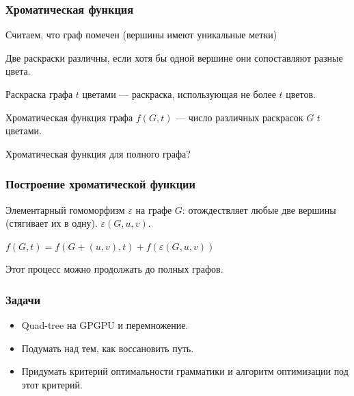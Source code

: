 \documentclass[xcolor=table]{beamer}
\begin{document}
\begin{frame} \frametitle{Хроматическая функция}
Считаем, что граф помечен (вершины имеют уникальные метки)
\begin{definition}
Две раскраски различны, если хотя бы одной вершине они сопоставляют разные цвета.
\end{definition}
\pause

\begin{definition}
Раскраска графа $t$ цветами --- раскраска, использующая не более $t$ цветов.
\end{definition}
\pause

\begin{definition}
Хроматическая функция графа $f(G,t)$ --- число различных раскрасок $G$ $t$ цветами.
\end{definition}
\pause
Хроматическая функция для полного графа?
\end{frame}


\begin{frame} \frametitle{Построение хроматической функции}

\begin{definition}
Элементарный гомоморфизм $\varepsilon$ на графе $G$: отождествляет любые две вершины (стягивает их в одну).
$\varepsilon(G,u,v)$.
\end{definition}
\pause

\begin{theorem}
$f(G,t) = f(G + (u,v), t) + f(\varepsilon(G,u,v))$
\end{theorem}
\pause
Этот процесс можно продолжать до полных графов. 

\end{frame}


\begin{frame} \frametitle{Задачи}

\begin{itemize}
\item Quad-tree на GPGPU и перемножение.
\item Подумать над тем, как воссановить путь.
\item Придумать критерий оптимальности грамматики и алгоритм оптимизации под этот критерий.
\end{itemize}

\end{frame}
\end{document}
